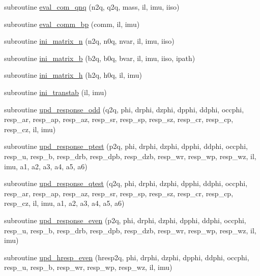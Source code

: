 \begin{DoxyCompactItemize}
\item 
subroutine \hyperlink{namespacelinresponse_a4c1e86b5926885714434e0012651a467}{eval\+\_\+com\+\_\+qnq} (n2q, q2q, mass, il, imu, iiso)
\item 
subroutine \hyperlink{namespacelinresponse_adbdb635326275de10b74819756129ab1}{eval\+\_\+comm\+\_\+bp} (comm, il, imu)
\item 
subroutine \hyperlink{namespacelinresponse_abc710f3e14e21d9ede646126558cac98}{ini\+\_\+matrix\+\_\+n} (n2q, n0q, nvar, il, imu, iiso)
\item 
subroutine \hyperlink{namespacelinresponse_a294e9689fc6deb2f4dc10e196f9fccd9}{ini\+\_\+matrix\+\_\+b} (b2q, b0q, bvar, il, imu, iiso, ipath)
\item 
subroutine \hyperlink{namespacelinresponse_a40b22e27e8ea2570813e27e87b83ffc3}{ini\+\_\+matrix\+\_\+h} (h2q, h0q, il, imu)
\item 
subroutine \hyperlink{namespacelinresponse_a98499d053119f8816eb583fee6d3b324}{ini\+\_\+transtab} (il, imu)
\item 
subroutine \hyperlink{namespacelinresponse_ae67606daa1380ebab58a59916942bc29}{upd\+\_\+response\+\_\+odd} (q2q, phi, drphi, dzphi, dpphi, ddphi, occphi, resp\+\_\+ar, resp\+\_\+ap, resp\+\_\+az, resp\+\_\+sr, resp\+\_\+sp, resp\+\_\+sz, resp\+\_\+cr, resp\+\_\+cp, resp\+\_\+cz, il, imu)
\item 
subroutine \hyperlink{namespacelinresponse_a38e3c48d5c409e1d841d02727ff27488}{upd\+\_\+response\+\_\+ptest} (p2q, phi, drphi, dzphi, dpphi, ddphi, occphi, resp\+\_\+u, resp\+\_\+b, resp\+\_\+drb, resp\+\_\+dpb, resp\+\_\+dzb, resp\+\_\+wr, resp\+\_\+wp, resp\+\_\+wz, il, imu, a1, a2, a3, a4, a5, a6)
\item 
subroutine \hyperlink{namespacelinresponse_ae0070fd7f0f72238fd255f7c9878daf1}{upd\+\_\+response\+\_\+qtest} (q2q, phi, drphi, dzphi, dpphi, ddphi, occphi, resp\+\_\+ar, resp\+\_\+ap, resp\+\_\+az, resp\+\_\+sr, resp\+\_\+sp, resp\+\_\+sz, resp\+\_\+cr, resp\+\_\+cp, resp\+\_\+cz, il, imu, a1, a2, a3, a4, a5, a6)
\item 
subroutine \hyperlink{namespacelinresponse_a5f0a600485b5318b97a183ecbb632e14}{upd\+\_\+response\+\_\+even} (p2q, phi, drphi, dzphi, dpphi, ddphi, occphi, resp\+\_\+u, resp\+\_\+b, resp\+\_\+drb, resp\+\_\+dpb, resp\+\_\+dzb, resp\+\_\+wr, resp\+\_\+wp, resp\+\_\+wz, il, imu)
\item 
subroutine \hyperlink{namespacelinresponse_aa613217289744fb8a260a787a6486cd5}{upd\+\_\+hresp\+\_\+even} (hresp2q, phi, drphi, dzphi, dpphi, ddphi, occphi, resp\+\_\+u, resp\+\_\+b, resp\+\_\+wr, resp\+\_\+wp, resp\+\_\+wz, il, imu)

\end{DoxyCompactItemize}
